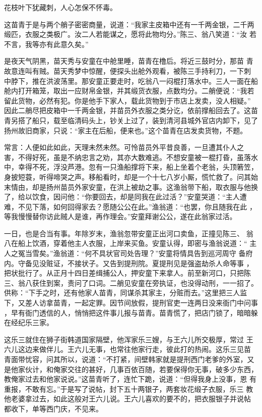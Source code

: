 花枝叶下犹藏刺，人心怎保不怀毒。

这苗青于是与两个艄子密密商量，说道：“我家主皮箱中还有一千两金银，二千两
缎匹，衣服之类极广。汝二人若能谋之，愿将此物均分。”陈三、翁八笑道：“汝
若不言，我等亦有此意久矣。”

是夜天气阴黑，苗天秀与安童在中舱里睡，苗青在橹后。将近三鼓时分，那苗
青故意连叫有贼。苗天秀梦中惊醒，便探头出舱外观看，被陈三手持利刀，一下刺
中脖下，推在洪波荡里。那安童正要走时，吃翁八一闷棍打落水中。三人一面在船
舱内打开箱笼，取出一应财帛金银，并其缎货衣服，点数均分。二艄便说：“我若
留此货物，必然有犯。你是他手下家人，载此货物到于市店上发卖，没人相疑。”
因此二艄尽把皮箱中一千两金银，并苗员外衣服之类分讫，依前撑船回去了。这苗
青另搭了船只，载至临清码头上，钞关上过了，装到清河县城外官店内卸下，见了
扬州故旧商家，只说：“家主在后船，便来也。”这个苗青在店发卖货物，不题。

常言：人便如此如此，天理未然未然。可怜苗员外平昔良善，一旦遭其仆人之
害，不得好死，虽是不纳忠言之劝，其亦大数难逃。不想安童被一棍打昏，虽落水
中，幸得不死，浮没芦港。忽有一只渔船撑将下来，船上坐着个老翁，头顶箬笠，
身披短蓑，听得啼哭之声。移船看时，却是一个十七八岁小厮，慌忙救了。问其始
末情由，却是扬州苗员外家安童，在洪上被劫之事。这渔翁带下船，取衣服与他换
了，给以饮食，因问他：“你要回去，却是同我在此过活？”安童哭道：“主人遭
难，不见下落，如何回得家去？愿随公公在此。”渔翁道：“也罢，你且随我在此
，等我慢慢替你访此贼人是谁，再作理会。”安童拜谢公公，遂在此翁家过活。

一日，也是合当有事。年除岁末，渔翁忽带安童正出河口卖鱼，正撞见陈三、
翁八在船上饮酒，穿着他主人衣服，上岸来买鱼。安童认得，即密与渔翁说道：“
主人之冤当雪矣。”渔翁道：“何不具状官司处告理？”安童将情具告到巡河周守
备府内。守备见没赃证，不接状子。又告到提刑院。夏提刑见是强盗劫杀人命等事
，把状批行了。从正月十四日差缉捕公人，押安童下来拿人。前至新河口，只把陈
三、翁八获住到案，责问了口词。二艄见安童在旁执证，也没得动刑，一一招了。
供称：“下手之时，还有他家人苗青，同谋杀其家主，分赃而去。”这里把三人监
下，又差人访拿苗青，一起定罪。因节间放假，提刑官吏一连两日没来衙门中问事
，早有衙门透信的人，悄悄把这件事儿报与苗青。苗青慌了，把店门锁了，暗暗躲
在经纪乐三家。

这乐三就住在狮子街韩道国家隔壁，他浑家乐三嫂，与王六儿所交极厚，常过
王六儿这边来做伴儿。王六儿无事，也常往他家行走，彼此打的热闹。这乐三见苗
青面带忧容，问其所以，说道：“不打紧，间壁韩家就是提刑西门老爹的外室，又
是他家伙计，和俺家交往的甚好，几事百依百随，若要保得你无事，破多少东西，
教俺家过去和他家说说。”这苗青听了，连忙下跪，说道：“但得我身上没事，恩
有重报，不敢有忘。”于是写了说帖，封下五十两银子，两套妆花缎子衣服，乐三
教他老婆拿过去，如此这般对王六儿说。王六儿喜欢的要不的，把衣服银子并说帖
都收下，单等西门庆，不见来。

